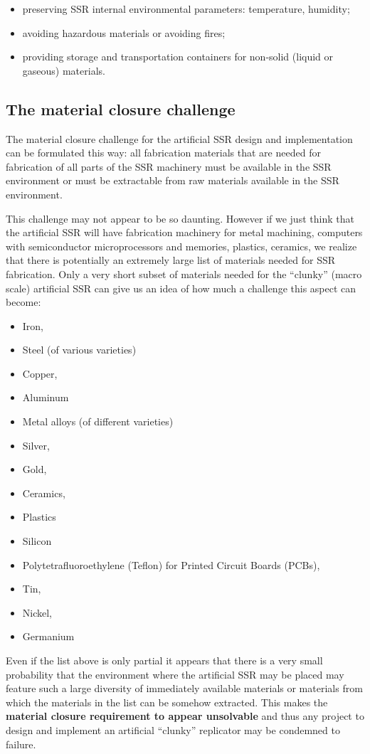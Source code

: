 \begin{itemize}
\begin{itemize}
\item preserving SSR internal environmental parameters: temperature,
humidity; 
\item avoiding hazardous materials or avoiding fires;
\item providing storage and transportation containers for non-solid
(liquid or gaseous) materials.
\end{itemize}
\end{itemize}
\subsection[The material closure challenge]{The material closure
challenge}
\hypertarget{RefHeading3140306210128}{}The material closure challenge
for the artificial SSR design and implementation can be formulated this
way: all fabrication materials that are needed for fabrication of all
parts of the SSR machinery must be available in the SSR environment or
must be extractable from raw materials available in the SSR
environment.


\bigskip

This challenge may not appear to be so daunting. However if we just
think that the artificial SSR will have fabrication machinery for metal
machining, computers with semiconductor microprocessors and memories,
plastics, ceramics, we realize that there is potentially an extremely
large list of materials needed for SSR fabrication. Only a very short
subset of materials needed for the “clunky” (macro scale) artificial
SSR can give us an idea of how much a challenge this aspect can become:


\bigskip

\begin{itemize}
\item Iron,
\item Steel (of various varieties)
\item Copper,
\item Aluminum
\item Metal alloys (of different varieties)
\item Silver,
\item Gold,
\item Ceramics,
\item Plastics
\item Silicon
\item Polytetrafluoroethylene (Teflon) for Printed Circuit Boards
(PCBs),
\item Tin,
\item Nickel,
\item Germanium
\end{itemize}
Even if the list above is only partial it appears that there is a very
small probability that the environment where the artificial SSR may be
placed may feature such a large diversity of immediately available
materials or materials from which the materials in the list can be
somehow extracted. This makes the \textbf{material closure requirement
to appear unsolvable} and thus any project to design and implement an
artificial “clunky” replicator may be condemned to failure. 


